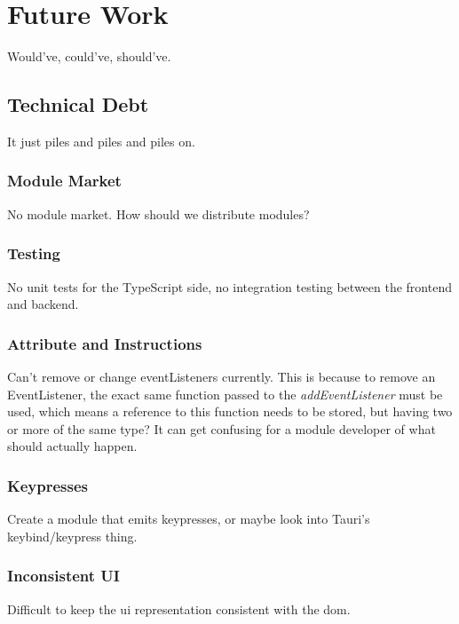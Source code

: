 \chapter{Future Work}

Would've, could've, should've.


\section{Technical Debt}

It just piles and piles and piles on.

\subsection{Module Market}

No module market. How should we distribute modules?

\subsection{Testing}

No unit tests for the TypeScript side, no integration testing between the
frontend and backend.

\subsection{Attribute and Instructions}

Can't remove or change eventListeners currently. This is because to remove an
EventListener, the exact same function passed to the \textit{addEventListener}
must be used, which means a reference to this function needs to be stored, but
having two or more of the same type? It can get confusing for a module developer
of what should actually happen.

\subsection{Keypresses}

Create a module that emits keypresses, or maybe look into Tauri's
keybind/keypress thing.

\subsection{Inconsistent UI}

Difficult to keep the \gls{ui} representation consistent with the \gls{dom}.

